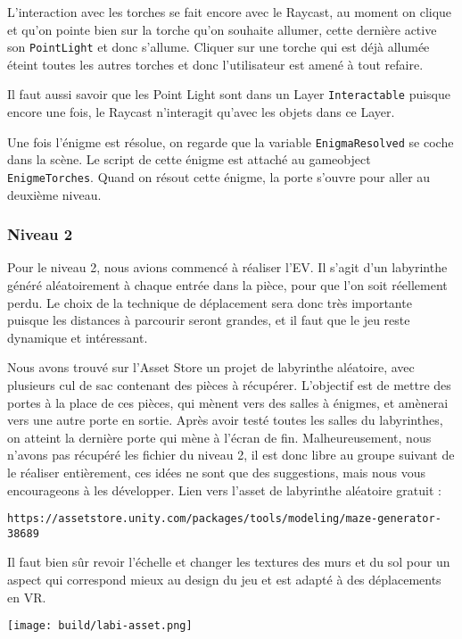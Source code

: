 \documentclass[12pt]{article}
\begin{document}
L’interaction avec les torches se fait encore avec le Raycast, au moment on clique et qu’on pointe bien sur la torche qu’on souhaite allumer, cette dernière active son \verb!PointLight! et donc s’allume. Cliquer sur une torche qui est déjà allumée éteint toutes les autres torches et donc l’utilisateur est amené à tout refaire.

Il faut aussi savoir que les Point Light sont dans un Layer \verb!Interactable! puisque encore une fois, le Raycast n’interagit qu’avec les objets dans ce Layer.

Une fois l’énigme est résolue, on regarde que la variable \verb!EnigmaResolved! se coche dans la scène. Le script de cette énigme est attaché au gameobject \verb!EnigmeTorches!. Quand on résout cette énigme, la porte s'ouvre pour aller au deuxième niveau.

\subsubsection{Niveau 2}
Pour le niveau 2, nous avions commencé à réaliser l’EV. Il s’agit d’un labyrinthe généré aléatoirement à chaque entrée dans la pièce, pour que l’on soit réellement perdu. Le choix de la technique de déplacement sera donc très importante puisque les distances à parcourir seront grandes, et il faut que le jeu reste dynamique et intéressant.

Nous avons trouvé sur l’Asset Store un projet de labyrinthe aléatoire, avec plusieurs cul de sac contenant des pièces à récupérer. L’objectif est de mettre des portes à la place de ces pièces, qui mènent vers des salles à énigmes, et amènerai vers une autre porte en sortie. Après avoir testé toutes les salles du labyrinthes, on atteint la dernière porte qui mène à l’écran de fin. Malheureusement, nous n’avons pas récupéré les fichier du niveau 2, il est donc libre au groupe suivant de le réaliser entièrement, ces idées ne sont que des suggestions, mais nous vous encourageons à les développer. Lien vers l’asset de labyrinthe aléatoire gratuit :
\begin{center}
    \verb!https://assetstore.unity.com/packages/tools/modeling/maze-generator-38689!
\end{center}

Il faut bien sûr revoir l’échelle et changer les textures des murs et du sol pour un aspect qui correspond mieux au design du jeu et est adapté à des déplacements en VR.

\begin{center}
    \texttt{[image: build/labi-asset.png]}
\end{center}
\end{document}
